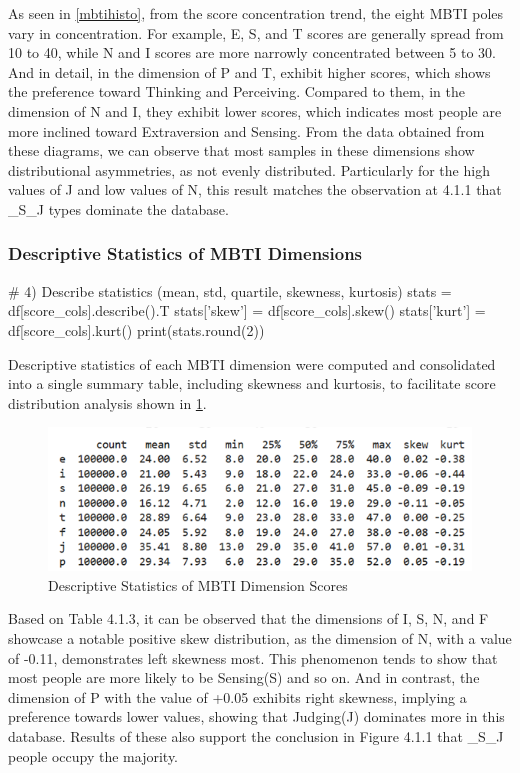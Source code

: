 \documentclass[12pt]{article}
\numberwithin{figure}{section}  %
\begin{document}
	As seen in \cref{mbtihisto}, from the score concentration trend, the eight
	MBTI poles vary in concentration. For example, E, S, and T scores are
	generally spread from 10 to 40, while N and I scores are more narrowly
	concentrated between 5 to 30. And in detail, in the dimension of P and T,
	exhibit higher scores, which shows the preference toward Thinking and
	Perceiving. Compared to them, in the dimension of N and I, they exhibit
	lower scores, which indicates most people are more inclined toward
	Extraversion and Sensing.
	From the data obtained from these diagrams, we can observe that most samples
	in these dimensions show distributional asymmetries, as not evenly
	distributed. Particularly for the high values of J and low values of N, this
	result matches the observation at 4.1.1 that \_S\_J types dominate the %
	database.
	
\subsubsection{Descriptive Statistics of MBTI Dimensions}
	\begin{python}
# 4) Describe statistics (mean, std, quartile, skewness, kurtosis)
stats = df[score_cols].describe().T
stats['skew']  = df[score_cols].skew()
stats['kurt']  = df[score_cols].kurt()
print(stats.round(2))
	\end{python}
	

	
	Descriptive statistics of each MBTI dimension were computed and consolidated
	into a single summary table, including skewness and kurtosis, to facilitate
	score distribution analysis shown in \cref{descstatmbti}.
	
	\begin{figure}[H]
		\centering
		\includegraphics{Q1EDA6} 
		\caption{Descriptive Statistics of MBTI Dimension Scores}	
		\label{descstatmbti}	
	\end{figure}
	
	Based on Table 4.1.3, it can be observed that the dimensions of I, S, N, and %
	F showcase a notable positive skew distribution, as the dimension of N, with
	a value of -0.11, demonstrates left skewness most. This phenomenon tends to
	show that most people are more likely to be Sensing(S) and so on. And in
	contrast, the dimension of P with the value of +0.05 exhibits right
	skewness, implying a preference towards lower values, showing that
	Judging(J) dominates more in this database. Results of these also support
	the conclusion in Figure 4.1.1 that \_S\_J people occupy the majority. %
	
\end{document}
